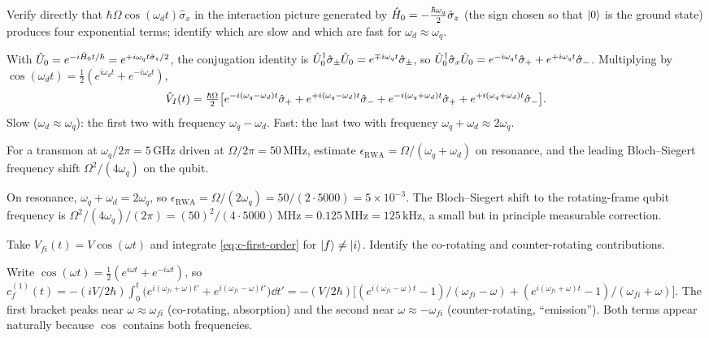 \begin{exercise}
Verify directly that
$\hbar\Omega\cos(\omega_d t)\hat\sigma_x$ in the interaction picture
generated by $\hat{H}_0=-\tfrac{\hbar\omega_q}{2}\hat\sigma_z$
(the sign chosen so that $\ket{0}$ is the ground state)
produces four exponential terms; identify which are slow and
which are fast for $\omega_d\approx\omega_q$.
\begin{solution}
With $\hat{U}_0=e^{-i\hat{H}_0 t/\hbar}=e^{+i\omega_q t\hat\sigma_z/2}$,
the conjugation identity is
$\hat{U}_0^\dagger\hat\sigma_\pm\hat{U}_0=e^{\mp i\omega_q t}\hat\sigma_\pm$,
so $\hat{U}_0^\dagger\hat\sigma_x\hat{U}_0
= e^{-i\omega_q t}\hat\sigma_+ + e^{+i\omega_q t}\hat\sigma_-$.
Multiplying by
$\cos(\omega_d t)=\tfrac12(e^{i\omega_d t}+e^{-i\omega_d t})$,
\[
\hat{V}_I(t)=\tfrac{\hbar\Omega}{2}\bigl[
e^{-i(\omega_q-\omega_d)t}\hat\sigma_+ + e^{+i(\omega_q-\omega_d)t}\hat\sigma_-
+ e^{-i(\omega_q+\omega_d)t}\hat\sigma_+ + e^{+i(\omega_q+\omega_d)t}\hat\sigma_-\bigr].
\]
Slow ($\omega_d\approx\omega_q$): the first two with frequency
$\omega_q-\omega_d$. Fast: the last two with frequency
$\omega_q+\omega_d\approx 2\omega_q$.
\end{solution}
\end{exercise}

\begin{exercise}
For a transmon at $\omega_q/2\pi=5\,\text{GHz}$ driven at
$\Omega/2\pi=50\,\text{MHz}$, estimate
$\epsilon_\text{RWA}=\Omega/(\omega_q+\omega_d)$ on resonance, and
the leading Bloch--Siegert frequency shift
$\Omega^2/(4\omega_q)$ on the qubit.
\begin{solution}
On resonance, $\omega_q+\omega_d=2\omega_q$, so
$\epsilon_\text{RWA}=\Omega/(2\omega_q)=50/(2\cdot 5000)=5\times 10^{-3}$.
The Bloch--Siegert shift to the rotating-frame qubit frequency is
$\Omega^2/(4\omega_q)/(2\pi)=(50)^2/(4\cdot 5000)\,\text{MHz}=0.125\,\text{MHz}=125\,\text{kHz}$,
a small but in principle measurable correction.
\end{solution}
\end{exercise}

\begin{exercise}
Take $V_{fi}(t)=V\cos(\omega t)$ and integrate
\cref{eq:c-first-order} for $\ket f\neq\ket i$. Identify the
co-rotating and counter-rotating contributions.
\begin{solution}
Write $\cos(\omega t)=\tfrac12(e^{i\omega t}+e^{-i\omega t})$, so
$c_f^{(1)}(t)=-(iV/2\hbar)\!\int_0^t\!\bigl(e^{i(\omega_{fi}+\omega)t'}+e^{i(\omega_{fi}-\omega)t'}\bigr)\dd t'
=-(V/2\hbar)\bigl[(e^{i(\omega_{fi}-\omega)t}-1)/(\omega_{fi}-\omega)+(e^{i(\omega_{fi}+\omega)t}-1)/(\omega_{fi}+\omega)\bigr]$.
The first bracket peaks near $\omega\approx\omega_{fi}$ (co-rotating,
absorption) and the second near $\omega\approx-\omega_{fi}$
(counter-rotating, ``emission''). Both terms appear naturally
because $\cos$ contains both frequencies.
\end{solution}
\end{exercise}

